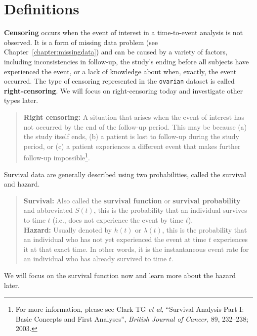 
\section{Definitions}

\textbf{Censoring} occurs when the event of interest in a time-to-event analysis is not observed. It is a form of missing data problem (see Chapter~\ref{chapter:missingdata}) and can be caused by a variety of factors, including inconsistencies in follow-up, the study's ending before all subjects have experienced the event, or a lack of knowledge about when, exactly, the event occurred. The type of censoring represented in the \texttt{ovarian} dataset is called \textbf{right-censoring}. We will focus on right-censoring today and investigate other types later.
\begin{quote}
\textbf{Right censoring:} A situation that arises when the event of interest has not occurred by the end of the follow-up period. This may be because (a) the study itself ends, (b) a patient is lost to follow-up during the study period, or (c) a patient experiences a different event that makes further follow-up impossible\footnote{For more information, please see Clark TG \emph{et al}, ``Survival Analysis Part I: Basic Concepts and First Analyses'', \emph{British Journal of Cancer}, 89, 232--238; 2003.}.
\end{quote}

Survival data are generally described using two probabilities, called the survival and hazard. 
\begin{quote}
\textbf{Survival:} Also called the \textbf{survival function} or \textbf{survival probability} and abbreviated $S(t)$, this is the probability that an individual survives to time $t$ (i.e., does not experience the event by time $t$).\\[5mm]
\textbf{Hazard:} Usually denoted by $h(t)$ or $\lambda(t)$, this is the probability that an individual who has not yet experienced the event at time $t$ experiences it at that exact time. In other words, it is the instantaneous event rate for an individual who has already survived to time $t$. 
\end{quote}

We will focus on the survival function now and learn more about the hazard later. 


